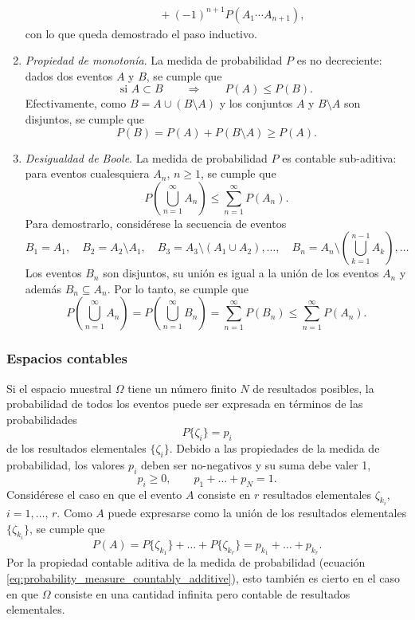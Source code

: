 \documentclass[a4paper]{report}
\begin{document}
\begin{enumerate}
\begin{equation*}
\begin{aligned}
   &\qquad+(-1)^{n+1}P(A_1\cdots A_{n+1}),
\end{aligned}
\end{equation*}
\endgroup 
con lo que queda demostrado el paso inductivo.
\item \emph{Propiedad de monotonía}. La medida de probabilidad \(P\) es no decreciente: dados dos eventos \(A\) y \(B\), se cumple que
\begin{equation}\label{eq:probability_monotony_property}
 \textrm{si } A\subset B\qquad \Rightarrow\qquad P(A)\leq P(B).
\end{equation}
Efectivamente, como \(B=A\cup(B\setminus A)\) y los conjuntos \(A\) y \(B\setminus A\) son disjuntos, se cumple que
\[
 P(B)=P(A)+P(B\setminus A)\geq P(A).
\]
\item \emph{Desigualdad de Boole}. La medida de probabilidad \(P\) es contable sub-aditiva: para eventos cualesquiera \(A_n\), \(n\geq 1\), se cumple que
\begin{equation}\label{eq:boole_inequality}
 P\left(\bigcup_{n=1}^{\infty}A_n\right)\leq\sum_{n=1}^{\infty}P(A_n).
\end{equation}
Para demostrarlo, considérese la secuencia de eventos
\[
 B_1=A_1,\quad B_2=A_2\setminus A_1,\quad B_3=A_3\setminus(A_1\cup A_2),\dots,\quad B_n=A_n\setminus\left(\bigcup_{k=1}^{n-1}A_k\right),\dots
\]
Los eventos \(B_n\) son disjuntos, su unión es igual a la unión de los eventos \(A_n\) y además \(B_n\subseteq A_n\). Por lo tanto, se cumple que
\[
 P\left(\bigcup_{n=1}^{\infty}A_n\right)=P\left(\bigcup_{n=1}^{\infty}B_n\right)=\sum_{n=1}^{\infty}P(B_n)\leq \sum_{n=1}^{\infty}P(A_n).
\]
\end{enumerate}

\subsubsection{Espacios contables} 

Si el espacio muestral \(\Omega\) tiene un número finito \(N\) de resultados posibles, la probabilidad de todos los eventos puede ser expresada en términos de las probabilidades
\[
 P\{\zeta_i\}=p_i
\]
de los resultados elementales \(\{\zeta_i\}\). Debido a las propiedades de la medida de probabilidad, los valores \(p_i\) deben ser no-negativos y su suma debe valer 1,
\[
 p_i\geq 0,\qquad p_1+\dots+p_N=1.
\]
Considérese el caso en que el evento \(A\) consiste en \(r\) resultados elementales \(\zeta_{k_i}\), \(i=1,\dots,\,r\). Como \(A\) puede expresarse como la unión de los resultados elementales \(\{\zeta_{k_i}\}\), se cumple que
\[
 P(A)=P\{\zeta_{k_1}\}+\dots+P\{\zeta_{k_r}\}=p_{k_1}+\dots+p_{k_r}.
\]
Por la propiedad contable aditiva de la medida de probabilidad (ecuación \ref{eq:probability_measure_countably_additive}), esto también es cierto en el caso en que \(\Omega\) consiste en una cantidad infinita pero contable de resultados elementales. 
\end{document}
